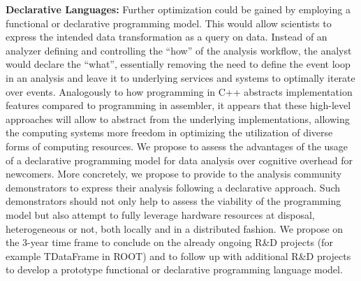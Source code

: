 \documentclass[12pt,a4paper]{article}
\begin{document}
{\bf Declarative Languages:} Further optimization could be gained by employing a functional or declarative programming model. This would allow scientists to express the intended data transformation as a query on data. Instead of an analyzer defining and controlling the ``how'' of the analysis workflow, the analyst would declare the ``what'', essentially removing the need to define the event loop in an analysis and leave it to underlying services and systems to optimally iterate over events. Analogously to how programming in C++ abstracts implementation features compared to programming in assembler, it appears that these high-level approaches will allow to abstract from the underlying implementations, allowing the computing systems more freedom in optimizing the utilization of diverse forms of computing resources. We propose to assess the advantages of the usage of a declarative programming model for data analysis over cognitive overhead for newcomers. More concretely, we propose to provide to the analysis community demonstrators to express their analysis following a declarative approach. Such demonstrators should not only help to assess the viability of the programming model but also attempt to fully leverage hardware resources at disposal, heterogeneous or not, both locally and in a distributed fashion. We propose on the 3-year time frame to conclude on the already ongoing R\&D projects (for example TDataFrame in ROOT) and to follow up with additional R\&D projects to develop a prototype functional or declarative programming language model. 
\end{document}
